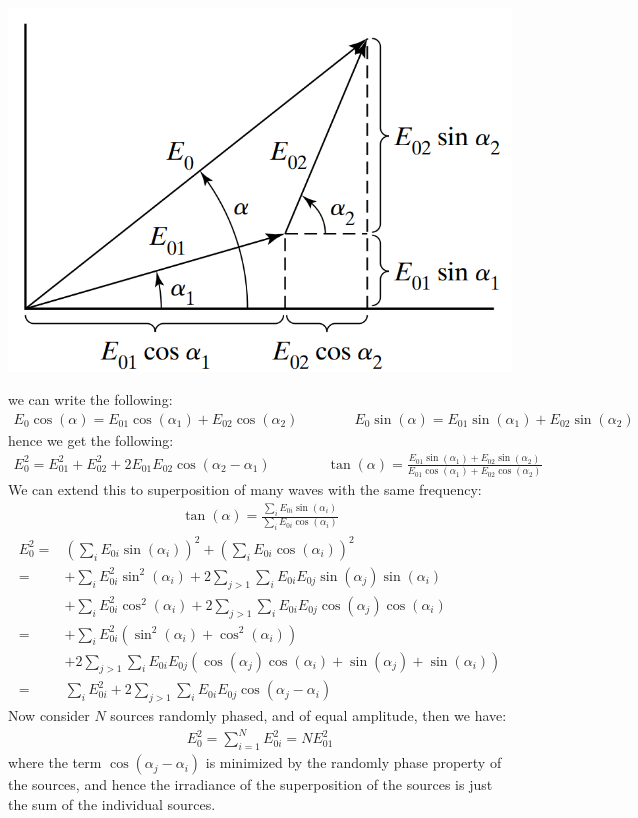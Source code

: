 \documentclass[11pt]{book}
\theoremstyle{break}
\theoremstyle{break}
\begin{document}
\begin{center}
\includegraphics[scale=0.38]{superpo.png}
\end{center}
we can write the following:
\begin{align*}
E_0 \cos(\alpha) = E_{01}\cos(\alpha_1) + E_{02}\cos(\alpha_2) \qquad\qquad E_0\sin(\alpha) = E_{01} \sin(\alpha_1) + E_{02}\sin(\alpha_2)
\end{align*}
hence we get the following:
\begin{align*}
E_0^2 = E_{01}^2 + E_{02}^2 + 2E_{01}E_{02} \cos(\alpha_2 - \alpha_1)\qquad\qquad 
\tan(\alpha) = \frac{E_{01}\sin(\alpha_1) + E_{02}\sin(\alpha_2)}{E_{01}\cos(\alpha_1)+E_{02}\cos(\alpha_2)}
\end{align*}
We can extend this to superposition of many waves with the same frequency:
\begin{align*}
\tan(\alpha) = \frac{\sum_i E_{0i}\sin(\alpha_i)}{\sum_i E_{0i}\cos(\alpha_i)}
\end{align*}
\begin{align*}
E_0^2 =& \left( \sum_i E_{0i}\sin(\alpha_i)\right)^2 + \left( \sum_i E_{0i}\cos(\alpha_i)\right)^2\\
=&+ \sum_i E_{0i}^2 \sin^2(\alpha_i) + 2\sum_{j >1} \sum_i E_{0i}E_{0j}\sin(\alpha_j)\sin(\alpha_i) \\
 &+ \sum_i E_{0i}^2 \cos^2(\alpha_i) + 2\sum_{j >1} \sum_i E_{0i}E_{0j}\cos(\alpha_j)\cos(\alpha_i)\\
=&+ \sum_i E_{0i}^2 \left( \sin^2(\alpha_i) + \cos^2(\alpha_i) \right)\\
 &+ 2\sum_{j >1} \sum_i E_{0i}E_{0j}\left(\cos(\alpha_j)\cos(\alpha_i)+\sin(\alpha_j) + \sin(\alpha_i)\right)\\
=& \sum_{i} E_{0i}^2 + 2\sum_{j>1}\sum_i E_{0i}E_{0j}\cos(\alpha_j - \alpha_i)
\end{align*}
Now consider $N$ sources randomly phased, and of equal amplitude, then we have:
\begin{align*}
E_0^2 = \sum_{i=1}^N E_{0i}^2  = N E_{01}^2
\end{align*}
where the term $\cos(\alpha_j - \alpha_i)$ is minimized by the randomly phase property of the sources, and hence the irradiance of the superposition of the sources is just the sum of the individual sources.\\
\end{document}
